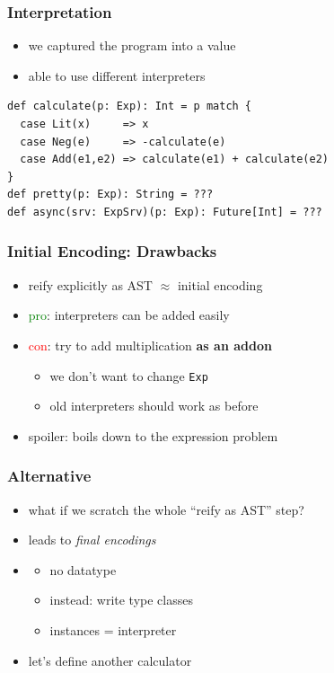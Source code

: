 \documentclass{beamer}
\begin{document}
\begin{frame}[fragile]
  \frametitle{Interpretation}
  \begin{itemize}
  \item we captured the program into a value
  \item able to use different interpreters
  \end{itemize}
\begin{verbatim}
def calculate(p: Exp): Int = p match {
  case Lit(x)     => x
  case Neg(e)     => -calculate(e)
  case Add(e1,e2) => calculate(e1) + calculate(e2)
}
def pretty(p: Exp): String = ???
def async(srv: ExpSrv)(p: Exp): Future[Int] = ???
\end{verbatim}
\end{frame}

\begin{frame}
  \frametitle{Initial Encoding: Drawbacks}
  \begin{itemize}
  \item reify explicitly as AST $\approx{}$ initial encoding
  \item \textcolor{green}{pro}: interpreters can be added easily
  \item \textcolor{red}{con}: try to add multiplication \textbf{as an addon}
    \begin{itemize}
    \item we don't want to change \texttt{Exp}
    \item old interpreters should work as before
    \end{itemize}
  \item spoiler: boils down to the expression problem
  \end{itemize}
\end{frame}

\begin{frame}
  \frametitle{Alternative}
  \begin{itemize}
  \item what if we scratch the whole ``reify as AST'' step?
  \item leads to \textit{final encodings}
  \item \begin{itemize}
    \item no datatype
    \item instead: write type classes
    \item instances = interpreter
    \end{itemize}
  \item let's define another calculator
  \end{itemize}
\end{frame}
\end{document}
